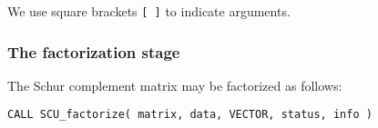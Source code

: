 \documentclass{galahad}
\newcommand{\packagename}{SCU}
\begin{document}
We use square brackets {\tt [ ]} to indicate \optional arguments.






 


\subsubsection{The factorization stage}
The Schur complement matrix may be factorized as follows:
\vspace*{1mm}

\hskip0.5in 
{\tt CALL \packagename\_factorize( matrix, data, VECTOR, status, info )}
\end{document}
